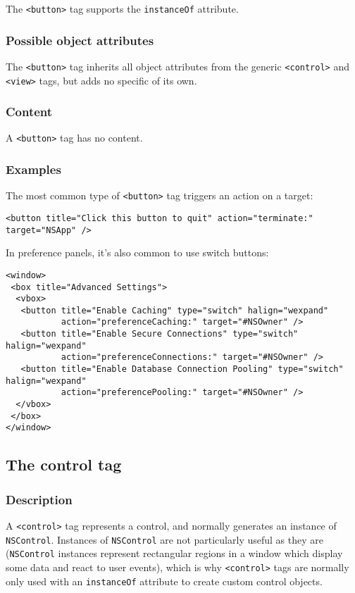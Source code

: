 The \texttt{<button>} tag supports the \texttt{instanceOf} attribute.

\subsubsection{Possible object attributes}
The \texttt{<button>} tag inherits all object attributes from the
generic \texttt{<control>} and \texttt{<view>} tags, but adds no
specific of its own.

\subsubsection{Content}
A \texttt{<button>} tag has no content.

\subsubsection{Examples}
The most common type of \texttt{<button>} tag triggers an action on a
target:
\begin{verbatim}
<button title="Click this button to quit" action="terminate:" target="NSApp" />
\end{verbatim}
In preference panels, it's also common to use switch buttons:
\begin{verbatim}
<window>
 <box title="Advanced Settings">
  <vbox>
   <button title="Enable Caching" type="switch" halign="wexpand" 
           action="preferenceCaching:" target="#NSOwner" />
   <button title="Enable Secure Connections" type="switch" halign="wexpand" 
           action="preferenceConnections:" target="#NSOwner" />
   <button title="Enable Database Connection Pooling" type="switch" halign="wexpand" 
           action="preferencePooling:" target="#NSOwner" />
  </vbox>
 </box>
</window>
\end{verbatim}

\subsection{The control tag}

\subsubsection{Description}

A \texttt{<control>} tag represents a control, and normally generates
an instance of \texttt{NSControl}.  Instances of \texttt{NSControl}
are not particularly useful as they are (\texttt{NSControl} instances
represent rectangular regions in a window which display some data and
react to user events), which is why \texttt{<control>} tags are
normally only used with an \texttt{instanceOf} attribute to create
custom control objects.

